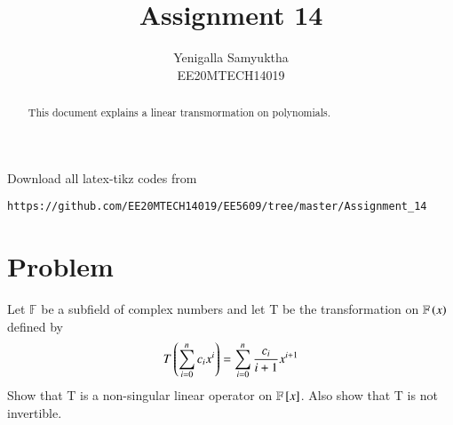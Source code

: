 \documentclass[journal,12pt,twocolumn]{IEEEtran}
\numberwithin{table}{section}
\begin{document}
     \def\rightbox#1{\makebox[0in][r]{#1}}
     \def\centbox#1{\makebox[0in]{#1}}
     \def\topbox#1{\raisebox{-\baselineskip}[0in][0in]{#1}}
     \def\midbox#1{\raisebox{-0.5\baselineskip}[0in][0in]{#1}}
\vspace{3cm}
\title{Assignment 14}
\author{Yenigalla Samyuktha\\EE20MTECH14019}
\maketitle
\newpage
\bigskip
\renewcommand{\thefigure}{\theenumi}
\renewcommand{\thetable}{1}
\setlength{\tabcolsep}{20pt}
\renewcommand{\arraystretch}{1.5}
\begin{abstract}
This document explains a linear transmormation on polynomials.
\end{abstract}
Download all latex-tikz codes from 
%
\begin{lstlisting}
https://github.com/EE20MTECH14019/EE5609/tree/master/Assignment_14
\end{lstlisting}
%
\section{Problem}
Let $\mathbb{F}$ be a subfield of complex numbers and let T be the transformation on $\mathbb{F}\left(x\right)$ defined by
\begin{align}
T\left(\sum \limits_{i=0}^n c_i x^i\right)=\sum \limits_{i=0}^n \frac{c_i}{i+1} x^{i+1}\label{q}
\end{align}
Show that T is a non-singular linear operator on $\mathbb{F}{}\left[x\right]$. Also show that T is not invertible.
\end{document}
